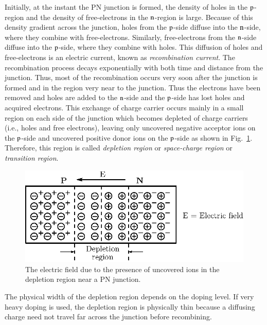 Initially, at the instant the PN junction is formed, the density of holes in the $\textrm{p}$-region and the density of free-electrons in the $\textrm{n}$-region is large. Because of this density gradient across the junction, holes from the $\textrm{p}$-side diffuse into the $\textrm{n}$-side, where they combine with free-electrons. Similarly, free-electrons from the $\textrm{n}$-side diffuse into the $\textrm{p}$-side, where they combine with holes. This diffusion of holes and free-electrons is an electric current, known as {\em recombination current}. The recombination process decays exponentially with both time and distance from the junction. Thus, most of the recombination occurs very soon after the junction is formed and in the region very near to the junction. Thus the electrons have been removed and holes are added to the $\textrm{n}$-side and the $\textrm{p}$-side has lost holes and acquired electrons. This exchange of charge carrier occurs mainly in a small region on each side
of the junction which becomes depleted of charge carriers (i.e., holes and free electrons), leaving only uncovered negative acceptor ions on the $\textrm{p}$-side and uncovered positive donor ions on the $\textrm{p}$-side as shown in Fig.~\ref{fig1.16}. Therefore, this region is called {\em depletion region} or {\em space-charge region} or {\em transition region}.
\begin{figure}[H]
\centering
\includegraphics{chap1/fig1.16.eps}
\caption{The electric field due to the presence of uncovered ions in the depletion region near a PN junction.}\label{fig1.16}
\end{figure}

The physical width of the depletion region depends on the doping level. If very heavy doping is used, the depletion region is physically thin because a diffusing charge need not travel far across the junction before recombining.

\eject

